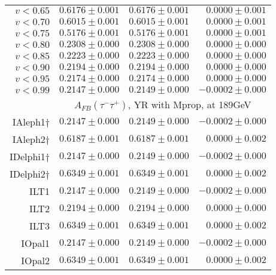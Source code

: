 \documentclass[12pt]{article}
\begin{document}
\begin{table}[!ht]
\begin{tabular}                                                                                          {||r|r|r|r||}
\\
 $ v<0.65$                       & $    0.6176\pm   0.001$ & $    0.6176\pm   0.001$ & $    0.0000\pm   0.001$
\\
 $ v<0.70$                       & $    0.6015\pm   0.001$ & $    0.6015\pm   0.001$ & $    0.0000\pm   0.001$
\\
 $ v<0.75$                       & $    0.5176\pm   0.001$ & $    0.5176\pm   0.001$ & $    0.0000\pm   0.001$
\\
 $ v<0.80$                       & $    0.2308\pm   0.000$ & $    0.2308\pm   0.000$ & $    0.0000\pm   0.000$
\\
 $ v<0.85$                       & $    0.2223\pm   0.000$ & $    0.2223\pm   0.000$ & $    0.0000\pm   0.000$
\\
 $ v<0.90$                       & $    0.2194\pm   0.000$ & $    0.2194\pm   0.000$ & $    0.0000\pm   0.000$
\\
 $ v<0.95$                       & $    0.2174\pm   0.000$ & $    0.2174\pm   0.000$ & $    0.0000\pm   0.000$
\\
 $ v<0.99$                       & $    0.2147\pm   0.000$ & $    0.2149\pm   0.000$ & $   -0.0002\pm   0.000$
\\
\hline
& \multicolumn{ 3}{c||}{
     $A_{FB}(\tau^-\tau^+)$, YR with Mprop, at 189GeV                                 }
\\
\hline
IAleph1$\dag$                    & $    0.2147\pm   0.000$ & $    0.2149\pm   0.000$ & $   -0.0002\pm   0.000$
\\
IAleph2$\dag$                    & $    0.6187\pm   0.001$ & $    0.6187\pm   0.001$ & $    0.0000\pm   0.002$
\\
IDelphi1$\dag$                   & $    0.2147\pm   0.000$ & $    0.2149\pm   0.000$ & $   -0.0002\pm   0.000$
\\
IDelphi2$\dag$                   & $    0.6349\pm   0.001$ & $    0.6349\pm   0.001$ & $    0.0000\pm   0.002$
\\
ILT1                             & $    0.2147\pm   0.000$ & $    0.2149\pm   0.000$ & $   -0.0002\pm   0.000$
\\
ILT2                             & $    0.2194\pm   0.000$ & $    0.2194\pm   0.000$ & $    0.0000\pm   0.000$
\\
ILT3                             & $    0.6349\pm   0.001$ & $    0.6349\pm   0.001$ & $    0.0000\pm   0.002$
\\
IOpal1                           & $    0.2147\pm   0.000$ & $    0.2149\pm   0.000$ & $   -0.0002\pm   0.000$
\\
IOpal2                           & $    0.6349\pm   0.001$ & $    0.6349\pm   0.001$ & $    0.0000\pm   0.002$
\\
\hline\hline
\end{tabular}
\end{table}
\end{document}
